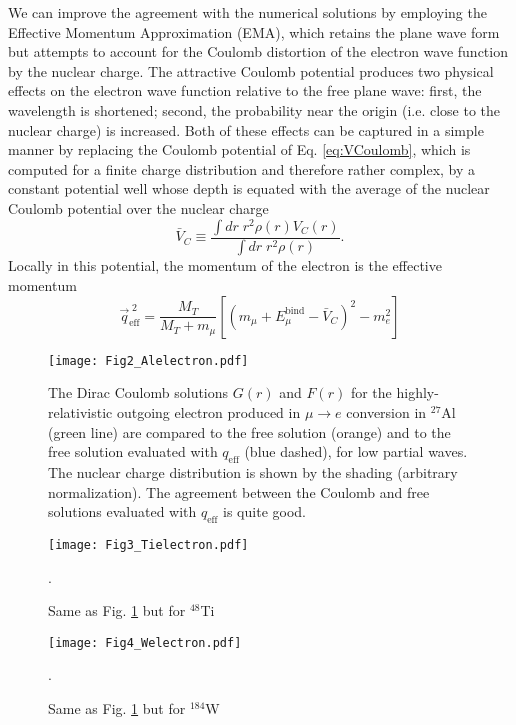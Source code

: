 \documentclass{book}[12pt]
\begin{document}
We can improve the agreement with the numerical solutions by employing the Effective Momentum Approximation (EMA), which retains the plane wave form but attempts to account for the Coulomb distortion of the electron wave function by the nuclear charge. The attractive Coulomb potential produces two physical effects on the electron wave function relative to the free plane wave: first, the wavelength is shortened; second, the probability near the origin (i.e. close to the nuclear charge) is increased. Both of these effects can be captured in a simple manner by replacing the Coulomb potential of Eq. \ref{eq:VCoulomb}, which is computed for a finite charge distribution and therefore rather complex, by a constant potential well whose depth is equated with the average of the nuclear Coulomb potential over the nuclear charge
\begin{equation}
\bar{V}_C\equiv \frac{\int dr \;r^2 \rho(r) V_C(r)}{\int dr \;r^2 \rho(r)}.
\end{equation}
Locally in this potential, the momentum of the electron is the effective momentum
\begin{equation}
\vec{q}_\mathrm{eff}^{\;2}=\frac{M_T}{M_T+m_{\mu}}\left[\left(m_{\mu}+E_{\mu}^\mathrm{bind}-\bar{V}_C\right)^2-m_e^2\right]
\end{equation}

\begin{figure}
\centering
\texttt{[image: Fig2\_Alelectron.pdf]}
\caption{The Dirac Coulomb solutions $G(r)$ and $F(r)$ for the highly-relativistic outgoing electron produced in $\mu\rightarrow e$ conversion in $^{27}$Al (green line) are compared to the free solution (orange) and to the free solution evaluated with $q_\mathrm{eff}$ (blue dashed), for low partial waves. The nuclear charge distribution is shown by the shading (arbitrary normalization). The agreement between the Coulomb and free solutions evaluated with $q_\mathrm{eff}$ is quite good.}
\label{fig:Alelectron}
\end{figure}
\begin{figure}
\centering
\texttt{[image: Fig3\_Tielectron.pdf]}
\caption{Same as Fig. \ref{fig:Alelectron} but for $^{48}$Ti}.
\label{fig:Tielectron}
\end{figure}
\begin{figure}
\centering
\texttt{[image: Fig4\_Welectron.pdf]}
\caption{Same as Fig. \ref{fig:Alelectron} but for $^{184}$W}.
\label{fig:Welectron}
\end{figure}
\end{document}
